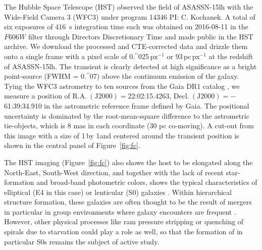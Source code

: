 \documentclass[traditabstract]{aa}
\newcommand{\farc}{\hbox{$.\!\!^{\prime\prime}$}}
\begin{document}
The Hubble Space Telescope (HST) observed the field of ASASSN-15lh with the Wide-Field Camera 3 (WFC3) under program 14346 PI: C. Kochanek. A total of six exposures of 416~s integration time each was obtained on 2016-08-11 in the $F606W$ filter through Directors Discretionary Time and made public in the HST archive. We download the processed and CTE-corrected data and drizzle them onto a single frame with a pixel scale of 0\farc{025}\,$\mathrm{px}^{-1}$ or 93\,pc\,px$^{-1}$ at the redshift of ASASSN-15lh. The transient is clearly detected at high significance as a bright point-source (FWHM = 0\farc{07}) above the continuum emission of the galaxy. Tying the WFC3 astrometry to ten sources from the Gaia DR1 catalog \citep{2016A&A...595A...2G, 2016A&A...595A...1G}, we measure a position of $\mathrm{R.A.~(J2000)}=$22:02:15.4263, $\mathrm{Decl.~(J2000)} = -$61:39:34.910 in the astrometric reference frame defined by Gaia. The positional uncertainty is dominated by the root-mean-square difference to the astrometric tie-objects, which is 8 mas in each coordinate (30 pc co-moving). A cut-out from this image with a size of 1\arcmin\,by 1\arcmin and centered around the transient position is shown in the central panel of Figure~\ref{fig:fc}.

The HST imaging (Figure~\ref{fig:fc}) also shows the host to be elongated along the North-East, South-West direction, and together with the lack of recent star-formation and broad-band photometric colors, shows the typical characteristics of elliptical (E4 in this case) or lenticular (S0) galaxies \citep[e.g.,][]{2009ARA&A..47..159B}. Within hierarchical structure formation, these galaxies are often thought to be the result of mergers in particular in group environments where galaxy encounters are frequent \citep[e.g.,][]{2005A&A...437...69B, 2011MNRAS.415.1783B}. However, other physical processes like ram pressure stripping or quenching of spirals due to starvation could play a role as well, so that the formation of in particular S0s remains the subject of active study.
\end{document}
